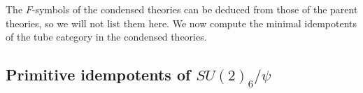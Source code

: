 %

The $F$-symbols of the condensed theories can be deduced from those of the parent theories, so we will not list them here.
We now compute the minimal idempotents of the tube category in the condensed theories.


\subsection{Primitive idempotents of $SU(2)_6/\psi$}
\label{SU2psiIdempotents}

